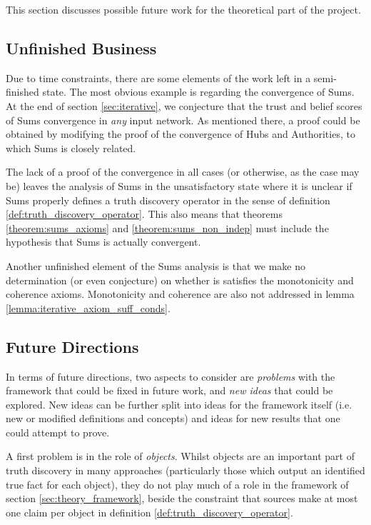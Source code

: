 \documentclass[../main.tex]{subfiles}
\begin{document}
This section discusses possible future work for the theoretical part of the
project.

\subsection{Unfinished Business}

Due to time constraints, there are some elements of the work left in a
semi-finished state. The most obvious example is regarding the convergence of
Sums. At the end of section \ref{sec:iterative}, we conjecture that the trust
and belief scores of Sums convergence in \emph{any} input network. As mentioned
there, a proof could be obtained by modifying the proof of the convergence of
Hubs and Authorities, to which Sums is closely related.

The lack of a proof of the convergence in all cases (or otherwise, as the case
may be) leaves the analysis of Sums in the unsatisfactory state where it is
unclear if Sums properly defines a truth discovery operator in the sense of
definition \ref{def:truth_discovery_operator}. This also means that theorems
\ref{theorem:sums_axioms} and \ref{theorem:sums_non_indep} must include the
hypothesis that Sums is actually convergent.

Another unfinished element of the Sums analysis is that we make no
determination (or even conjecture) on whether is satisfies the monotonicity and
coherence axioms. Monotonicity and coherence are also not addressed in lemma
\ref{lemma:iterative_axiom_suff_conds}.

\subsection{Future Directions}

In terms of future directions, two aspects to consider are \emph{problems} with
the framework that could be fixed in future work, and \emph{new ideas} that
could be explored. New ideas can be further split into ideas for the framework
itself (i.e. new or modified definitions and concepts) and ideas for new
results that one could attempt to prove.

A first problem is in the role of \emph{objects}. Whilst objects are an
important part of truth discovery in many approaches (particularly those which
output an identified true fact for each object), they do not play much of a
role in the framework of section \ref{sec:theory_framework}, beside the
constraint that sources make at most one claim per object in definition
\ref{def:truth_discovery_operator}.
\end{document}
